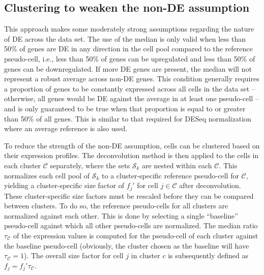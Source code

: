 \documentclass{article}
\begin{document}
\subsection{Clustering to weaken the non-DE assumption}
This approach makes some moderately strong assumptions regarding the nature of DE across the data set.
The use of the median is only valid when less than 50\% of genes are DE in any direction in the cell pool compared to the reference pseudo-cell,
    i.e., less than 50\% of genes can be upregulated and less than 50\% of genes can be downregulated.
If more DE genes are present, the median will not represent a robust average across non-DE genes.
This condition generally requires a proportion of genes to be constantly expressed across all cells in the data set 
    -- otherwise, all genes would be DE against the average in at least one pseudo-cell -- 
    and is only guaranteed to be true when that proportion is equal to or greater than 50\% of all genes.
This is similar to that required for DESeq normalization where an average reference is also used.

To reduce the strength of the non-DE assumption, cells can be clustered based on their expression profiles.
The deconvolution method is then applied to the cells in each cluster $\mathcal{C}$ separately,
    where the sets $\mathcal{S}_k$ are nested within each $\mathcal{C}$.
This normalizes each cell pool of $\mathcal{S}_k$ to a cluster-specific reference pseudo-cell for $\mathcal{C}$,
    yielding a cluster-specific size factor of $f_{j}'$ for cell $j \in \mathcal{C}$ after deconvolution.
These cluster-specific size factors must be rescaled before they can be compared between clusters.
To do so, the reference pseudo-cells for all clusters are normalized against each other.
This is done by selecting a single ``baseline'' pseudo-cell against which all other pseudo-cells are normalized.
The median ratio $\tau_{\mathcal{C}}$ of the expression values is computed for the pseudo-cell of each cluster against the baseline pseudo-cell
    (obviously, the cluster chosen as the baseline will have $\tau_{\mathcal{C}}=1$).
The overall size factor for cell $j$ in cluster $c$ is subsequently defined as $f_j = f_{j}'\tau_{\mathcal{C}}$.

\end{document}
